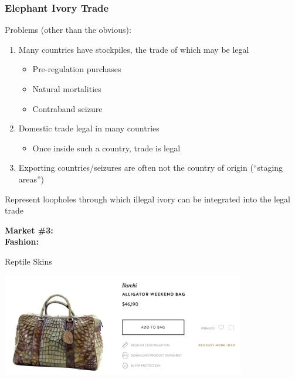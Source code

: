 \documentclass[10pt]{beamer}
\begin{document}
\begin{frame}[t]
\frametitle{Elephant Ivory Trade}
\vspace{0.5cm}

	Problems (other than the obvious):\\
	\medskip
		\begin{enumerate}
			\item Many countries have stockpiles, the trade of which may be legal
				\begin{itemize}
					\item Pre-regulation purchases
					\item Natural mortalities
					\item Contraband seizure
				\end{itemize}
			\medskip
			\item Domestic trade legal in many countries
				\begin{itemize}
					\item Once inside such a country, trade is legal\\
				\end{itemize}	
			\medskip
			\item Exporting countries/seizures are often not the country of origin (``staging areas'')
		\end{enumerate}

	\medskip
	
	Represent loopholes through which illegal ivory can be integrated into the legal trade
\end{frame}


\begin{frame}
	\begin{center}
		\Large{\textbf{\textcolor{myblue}{Market \#3:\\ Fashion:}}}\normalsize{}\\ 
		
		\vspace{0.25cm}
		
		Reptile Skins\\
		
		\vspace{1.0cm}
		
		\includegraphics[width=0.8\textwidth]{figures/aBag.png}
		
	\end{center}
\end{frame}
\end{document}
